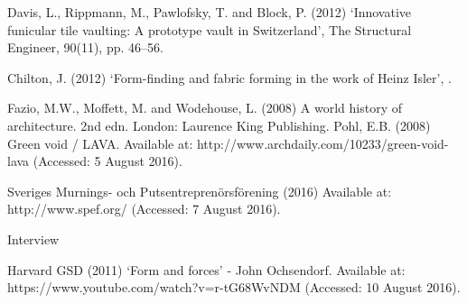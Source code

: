 \begin{thebibliography}{69}
 Davis, L., Rippmann, M., Pawlofsky, T. and Block, P. (2012) ‘Innovative funicular tile vaulting: A prototype vault in Switzerland’, The Structural Engineer, 90(11), pp. 46–56.

Chilton, J. (2012) ‘Form-finding and fabric forming in the work of Heinz Isler’, .


Fazio, M.W., Moffett, M. and Wodehouse, L. (2008) A world history of architecture. 2nd edn. London: Laurence King Publishing.
Pohl, E.B. (2008) Green void / LAVA. Available at: http://www.archdaily.com/10233/green-void-lava (Accessed: 5 August 2016).

Sveriges Murnings- och Putsentreprenörsförening (2016) Available at: http://www.spef.org/ (Accessed: 7 August 2016).

Interview

 Harvard GSD (2011) ‘Form and forces’ - John Ochsendorf. Available at: https://www.youtube.com/watch?v=r-tG68WvNDM (Accessed: 10 August 2016).

\end{thebibliography}





